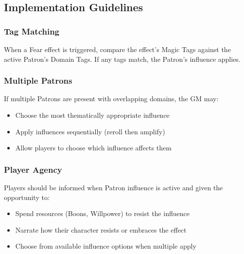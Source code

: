 \subsection{Implementation Guidelines}
\label{subsec:patron-fear-guidelines}

\subsubsection{Tag Matching}
When a Fear effect is triggered, compare the effect's Magic Tags against the active Patron's Domain Tags. If any tags match, the Patron's influence applies.

\subsubsection{Multiple Patrons}
If multiple Patrons are present with overlapping domains, the GM may:
\begin{itemize}
  \item Choose the most thematically appropriate influence
  \item Apply influences sequentially (reroll then amplify)
  \item Allow players to choose which influence affects them
\end{itemize}

\subsubsection{Player Agency}
Players should be informed when Patron influence is active and given the opportunity to:
\begin{itemize}
  \item Spend resources (Boons, Willpower) to resist the influence
  \item Narrate how their character resists or embraces the effect
  \item Choose from available influence options when multiple apply
\end{itemize}
